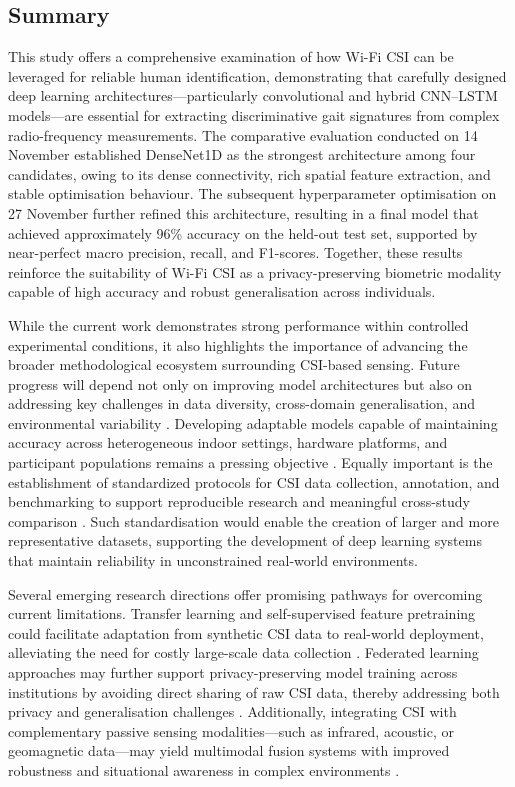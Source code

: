 \subsection{Summary}

This study offers a comprehensive examination of how Wi-Fi CSI can be leveraged for reliable human identification, demonstrating that carefully designed deep learning architectures—particularly convolutional and hybrid CNN–LSTM models—are essential for extracting discriminative gait signatures from complex radio-frequency measurements. The comparative evaluation conducted on 14 November established DenseNet1D as the strongest architecture among four candidates, owing to its dense connectivity, rich spatial feature extraction, and stable optimisation behaviour. The subsequent hyperparameter optimisation on 27 November further refined this architecture, resulting in a final model that achieved approximately 96\% accuracy on the held-out test set, supported by near-perfect macro precision, recall, and F1-scores. Together, these results reinforce the suitability of Wi-Fi CSI as a privacy-preserving biometric modality capable of high accuracy and robust generalisation across individuals.

While the current work demonstrates strong performance within controlled experimental conditions, it also highlights the importance of advancing the broader methodological ecosystem surrounding CSI-based sensing. Future progress will depend not only on improving model architectures but also on addressing key challenges in data diversity, cross-domain generalisation, and environmental variability \parencite{yang2023sensefi}. Developing adaptable models capable of maintaining accuracy across heterogeneous indoor settings, hardware platforms, and participant populations remains a pressing objective \parencite{li2025wifigeneralizability}. Equally important is the establishment of standardized protocols for CSI data collection, annotation, and benchmarking to support reproducible research and meaningful cross-study comparison \parencite{csibench2025}. Such standardisation would enable the creation of larger and more representative datasets, supporting the development of deep learning systems that maintain reliability in unconstrained real-world environments.

Several emerging research directions offer promising pathways for overcoming current limitations. Transfer learning and self-supervised feature pretraining could facilitate adaptation from synthetic CSI data to real-world deployment, alleviating the need for costly large-scale data collection \parencite{xu2023sslwifi}. Federated learning approaches may further support privacy-preserving model training across institutions by avoiding direct sharing of raw CSI data, thereby addressing both privacy and generalisation challenges \parencite{zhang2024fedwifi}. Additionally, integrating CSI with complementary passive sensing modalities—such as infrared, acoustic, or geomagnetic data—may yield multimodal fusion systems with improved robustness and situational awareness in complex environments \parencite{bandyopadhyay2025fedmagnet}.

